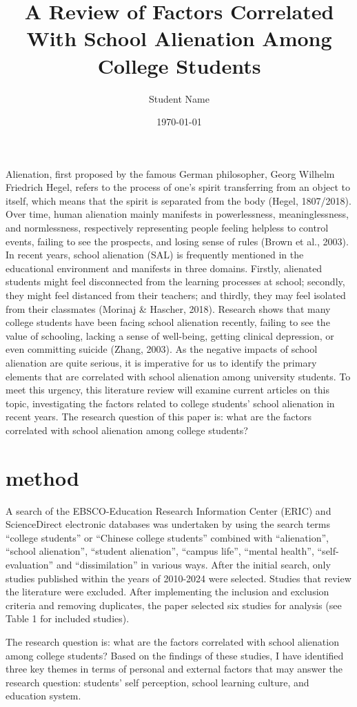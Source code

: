 \documentclass{studentpaper}
\title{A Review of Factors Correlated With School Alienation Among College Students}
\author{Student Name}
\institute{Sichuan University-Pittsburgh Institute}
\date{\today}
\begin{document}
\maketitle
\par
Alienation, first proposed by the famous German philosopher, Georg Wilhelm Friedrich 
Hegel, refers to the process of one’s spirit transferring from an object to itself, which means that 
the spirit is separated from the body (Hegel, 1807/2018). Over time, human alienation mainly 
manifests in powerlessness, meaninglessness, and normlessness, respectively representing people 
feeling helpless to control events, failing to see the prospects, and losing sense of rules (Brown et 
al., 2003). In recent years, school alienation (SAL) is frequently mentioned in the educational 
environment and manifests in three domains. Firstly, alienated students might feel disconnected 
from the learning processes at school; secondly, they might feel distanced from their teachers; 
and thirdly, they may feel isolated from their classmates (Morinaj \& Hascher, 2018). Research 
shows that many college students have been facing school alienation recently, failing to see the 
value of schooling, lacking a sense of well-being, getting clinical depression, or even committing 
suicide (Zhang, 2003). As the negative impacts of school alienation are quite serious, it is 
imperative for us to identify the primary elements that are correlated with school alienation 
among university students. To meet this urgency, this literature review will examine current 
articles on this topic, investigating the factors related to college students’ school alienation in 
recent years. The research question of this paper is: what are the factors correlated with school 
alienation among college students? 
\section{method}
A search of the EBSCO-Education Research Information Center (ERIC) and 
ScienceDirect electronic databases was undertaken by using the search terms “college students” 
or “Chinese college students” combined with “alienation”, “school alienation”, “student 
alienation”, “campus life”, “mental health”, “self-evaluation” and “dissimilation” in various 
ways. After the initial search, only studies published within the years of 2010-2024 were 
selected. Studies that review the literature were excluded. After implementing the inclusion and 
exclusion criteria and removing duplicates, the paper selected six studies for analysis (see Table 
1 for included studies).
\par
The research question is: what are the factors correlated with school alienation among 
college students? Based on the findings of these studies, I have identified three key themes in 
terms of personal and external factors that may answer the research question: students’ self
perception, school learning culture, and education system.
\end{document}
